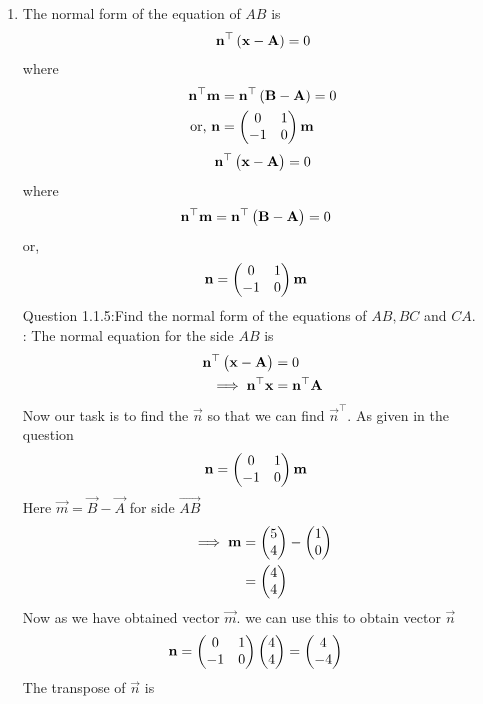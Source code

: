 \documentclass[11pt]{book}
\begin{document}
\begin{enumerate}[label=\thesection.\arabic*.,ref=\thesection.\theenumi]
\item The normal form of the equation of $AB$  is 
		\begin{align}
			\mathbf{n}^{\top}\left(	\mathbf{x}-\mathbf{A}\right) = 0
		\end{align}
		where 
		\begin{align}
			\mathbf{n}^{\top}\mathbf{m}&=\mathbf{n}^{\top}\left(\mathbf{B}-\mathbf{A}\right) = 0
			\\
			\text{or, } \mathbf{n}&=\begin{pmatrix}0 & 1 \\ -1 & 0\end{pmatrix} \mathbf{m}
		\end{align}
  \begin{align}
\mathbf{n}^{\top}\begin{pmatrix}\mathbf{x}-\mathbf{A}\end{pmatrix}=0
\end{align}
where
\begin{align}
\mathbf{n}^{\top}\mathbf{m}&=\mathbf{n}^{\top}\begin{pmatrix}\mathbf{B}-\mathbf{A}\end{pmatrix}=0
\end{align}	
or,\begin{align}
\mathbf{n}&=\begin{pmatrix}0 &1 \\-1 & 0\end{pmatrix}\mathbf{m}
\end{align}
Question 1.1.5:Find the normal form of the equations of $AB, BC$ and $CA$.\\
\solution:
       The normal equation for the side $AB$ is
\begin{align}
\mathbf{n}^{\top}\begin{pmatrix}\mathbf{x}-\mathbf{A}\end{pmatrix}&=0\\
\implies
\mathbf{n}^{\top}\mathbf{x}&=\mathbf{n}^{\top}\mathbf{A}
\end{align}
Now our task is to find the $\vec{n}$ so that we can find $\vec{n}^{\top}$.
As given in the question 
\begin{align}
  \mathbf{n} &= \begin{pmatrix}0 & 1\\
  -1 & 0\end{pmatrix}\mathbf{m}
\end{align}
Here $\vec{m} = \vec{B}- \vec{A}$ for side $\vec{AB}$
\begin{align}
\implies
\mathbf{m}&=\begin{pmatrix}5\\4\end{pmatrix} - \begin{pmatrix}1\\0\end{pmatrix}\\
&=\begin{pmatrix}4\\4\end{pmatrix}
\end{align}
Now as we have obtained vector $\vec{m}$.
we can use this to obtain vector $\vec{n}$
\begin{align}
\mathbf{n} &= \begin{pmatrix}0 & 1\\
  -1 & 0\end{pmatrix}\begin{pmatrix}4\\4\end{pmatrix}
 = \begin{pmatrix}4\\-4\end{pmatrix}
\end{align}
The transpose of $\vec{n}$ is
\begin{align}

\end{align}
\end{enumerate}
\end{document}
